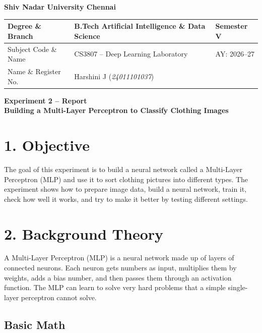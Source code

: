 \documentclass[11pt]{article}
\begin{document}
\begin{center}
\Large\textbf{Shiv Nadar University Chennai}\\[2mm]
\end{center}

\renewcommand{\arraystretch}{1.4}
\begin{tabular}{|p{3.5cm}|p{8cm}|p{2cm}|}
\hline
Degree \& Branch & B.Tech Artificial Intelligence \& Data Science & Semester V\\ \hline
Subject Code \& Name & CS3807 -- Deep Learning Laboratory & AY: 2026--27\\ \hline
Name \& Register No. & Harshini J \hfill (\textit{24011101037}) & \\ \hline
\end{tabular}

\vspace{3mm}

\begin{center}
\Large\textbf{Experiment 2 -- Report}\\
\large\textbf{Building a Multi-Layer Perceptron to Classify Clothing Images}
\end{center}

\section*{1. Objective}

The goal of this experiment is to build a neural network called a Multi-Layer Perceptron (MLP) and use it to sort clothing pictures into different types. The experiment shows how to prepare image data, build a neural network, train it, check how well it works, and try to make it better by testing different settings.

\section*{2. Background Theory}

A Multi-Layer Perceptron (MLP) is a neural network made up of layers of connected neurons. Each neuron gets numbers as input, multiplies them by weights, adds a bias number, and then passes them through an activation function. The MLP can learn to solve very hard problems that a simple single-layer perceptron cannot solve.

\subsection*{Basic Math}
\end{document}

